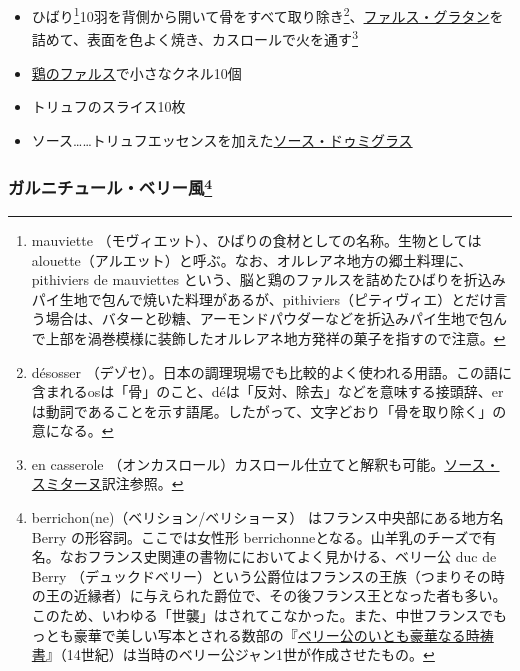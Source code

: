 \begin{recette}
\begin{itemize}
\item
  ひばり\footnote{mauviette
    （モヴィエット）、ひばりの食材としての名称。生物としてはalouette（アルエット）と呼ぶ。なお、オルレアネ地方の郷土料理に、
    pithiviers de mauviettes
    という、脳と鶏のファルスを詰めたひばりを折込みパイ生地で包んで焼いた料理があるが、pithiviers（ピティヴィエ）とだけ言う場合は、バターと砂糖、アーモンドパウダーなどを折込みパイ生地で包んで上部を渦巻模様に装飾したオルレアネ地方発祥の菓子を指すので注意。}10羽を背側から開いて骨をすべて取り除き\footnote{désosser
    （デゾセ）。日本の調理現場でも比較的よく使われる用語。この語に含まれるosは「骨」のこと、déは「反対、除去」などを意味する接頭辞、erは動詞であることを示す語尾。したがって、文字どおり「骨を取り除く」の意になる。}、\protect\hyperlink{farce-gratin-c}{ファルス・グラタン}を詰めて、表面を色よく焼き、カスロールで火を通す\footnote{en
    casserole
    （オンカスロール）カスロール仕立てと解釈も可能。\protect\hyperlink{sauce-smitane}{ソース・スミターヌ}訳注参照。}
\item
  \protect\hyperlink{farce-b}{鶏のファルス}で小さなクネル10個
\item
  トリュフのスライス10枚
\item
  ソース\ldots{}\ldots{}トリュフエッセンスを加えた\protect\hyperlink{sauce-demi-glace}{ソース・ドゥミグラス}
\end{itemize}

\hypertarget{garniture-berrichonne}{%
\subsubsection[ガルニチュール・ベリー風]{\texorpdfstring{ガルニチュール・ベリー風\footnote{berrichon(ne)（ベリション/ベリショーヌ）
  はフランス中央部にある地方名 Berry の形容詞。ここでは女性形
  berrichonneとなる。山羊乳のチーズで有名。なおフランス史関連の書物ににおいてよく見かける、ベリー公
  duc de Berry
  （デュックドベリー）という公爵位はフランスの王族（つまりその時の王の近縁者）に与えられた爵位で、その後フランス王となった者も多い。このため、いわゆる「世襲」はされてこなかった。また、中世フランスでもっとも豪華で美しい写本とされる数部の『\href{http://gallica.bnf.fr/ark:/12148/btv1b520004510}{ベリー公のいとも豪華なる時祷書}』（14世紀）は当時のベリー公ジャン1世が作成させたもの。}}{ガルニチュール・ベリー風}}\label{garniture-berrichonne}}




\end{recette}
